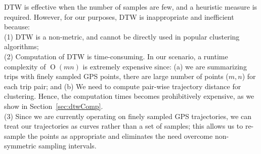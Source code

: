 DTW is effective when the number of samples are few, and a heuristic measure is required. However, for our purposes, DTW is inappropriate and inefficient because: 
\\\noindent(1) DTW is a non-metric, and cannot be directly used in popular clustering algorithms; 
\\\noindent(2) Computation of DTW is time-consuming. In our scenario, a runtime complexity of $\operatorname{O}(mn)$ is extremely expensive since: (a) we are summarizing trips with finely sampled GPS points, there are large number of points ($m,n$) for each trip pair; and (b) We need to compute pair-wise trajectory distance for clustering. Hence, the computation times becomes prohibitively expensive, as we show in Section~\ref{sec:dtwComp}.
\\\noindent(3) Since we are currently operating on finely sampled GPS trajectories, we can treat our trajectories as curves rather than a set of samples; this allows us to re-sample the points as appropriate and eliminates the need overcome non-symmetric sampling intervals.
